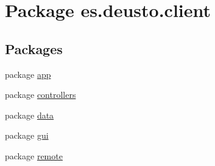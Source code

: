 \hypertarget{namespacees_1_1deusto_1_1client}{}\section{Package es.\+deusto.\+client}
\label{namespacees_1_1deusto_1_1client}
\subsection*{Packages}
\begin{DoxyCompactItemize}
\item 
package \mbox{\hyperlink{namespacees_1_1deusto_1_1client_1_1app}{app}}
\item 
package \mbox{\hyperlink{namespacees_1_1deusto_1_1client_1_1controllers}{controllers}}
\item 
package \mbox{\hyperlink{namespacees_1_1deusto_1_1client_1_1data}{data}}
\item 
package \mbox{\hyperlink{namespacees_1_1deusto_1_1client_1_1gui}{gui}}
\item 
package \mbox{\hyperlink{namespacees_1_1deusto_1_1client_1_1remote}{remote}}
\end{DoxyCompactItemize}
